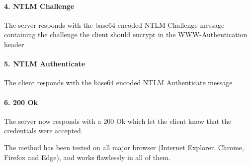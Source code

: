 \documentclass{article}
\begin{document}
\paragraph{4. NTLM Challenge} The server responds with the base64 encoded NTLM Challenge message containing the challenge the client should encrypt in the WWW-Authentication header
\paragraph{5. NTLM Authenticate} The client responds with the base64 encoded NTLM Authenticate message
\paragraph{6. 200 Ok} The server now responds with a 200 Ok which let the client know that the credentials were accepted.

The method has been tested on all major browser (Internet Explorer, Chrome, Firefox and Edge), and works flawlessly in all of them.
\end{document}
